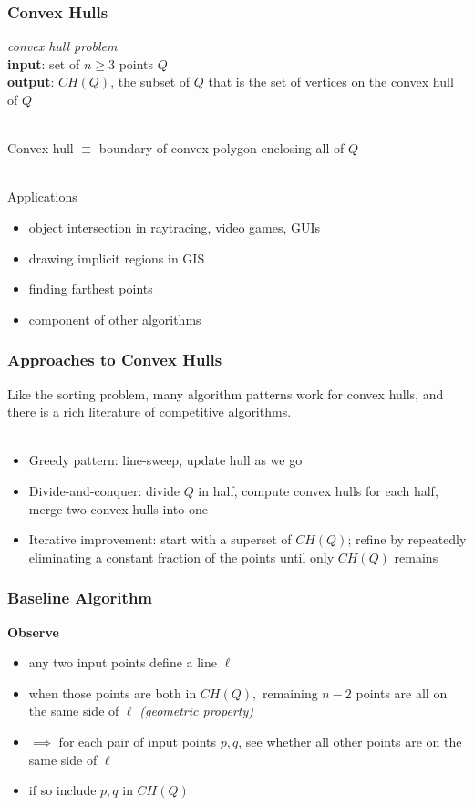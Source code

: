 \documentclass{beamer}
\newcommand{\stanza}{ \\~\ }
\begin{document}
\begin{frame} \frametitle{Convex Hulls}
\emph{convex hull problem} \\
\textbf{input}: set of $n \geq 3$ points $Q$ \\
\textbf{output}: $CH(Q)$, the subset of $Q$ that is the set of vertices on
  the convex hull of $Q$ \stanza

Convex hull $\equiv$ boundary of convex polygon enclosing all of $Q$ \stanza

Applications
\begin{itemize}
  \item object intersection in raytracing, video games, GUIs
  \item drawing implicit regions in GIS
  \item finding farthest points
  \item component of other algorithms
\end{itemize}
\end{frame}

\begin{frame} \frametitle{Approaches to Convex Hulls}
Like the sorting problem, many algorithm patterns work for convex hulls,
and there is a rich literature of competitive algorithms. \stanza

\begin{itemize}
  \item Greedy pattern: line-sweep, update hull as we go
  \item Divide-and-conquer: divide $Q$ in half, compute convex hulls for each
    half, merge two convex hulls into one
  \item Iterative improvement: start with a superset of $CH(Q)$; refine by repeatedly eliminating
    a constant fraction of the points until only $CH(Q)$ remains
\end{itemize}
\end{frame}

\begin{frame} \frametitle{Baseline Algorithm}
\textbf{Observe}
\begin{itemize}
  \item any two input points define a line $\ell$
  \item when those points are both in $CH(Q),$ remaining $n-2$ points are all on
    the same side of $\ell$ \emph{(geometric property)}
  \item $\implies$ for each pair of input points $p, q$, see whether all other points
    are on the same side of $\ell$
  \item if so include $p, q$ in $CH(Q)$
\end{itemize}
\end{frame}
\end{document}

